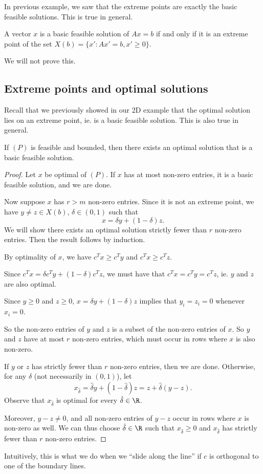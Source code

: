 \documentclass[a4paper]{article}
\begin{document}
In previous example, we saw that the extreme points are exactly the basic feasible solutions. This is true in general.
\begin{thm}
  A vector $x$ is a basic feasible solution of $Ax = b$ if and only if it is an extreme point of the set $X(b) = \{x': Ax' = b, x' \geq 0\}$.
\end{thm}
We will not prove this.

\subsection{Extreme points and optimal solutions}
Recall that we previously showed in our 2D example that the optimal solution lies on an extreme point, ie. is a basic feasible solution. This is also true in general.

\begin{thm}
  If $(P)$ is feasible and bounded, then there exists an optimal solution that is a basic feasible solution.
\end{thm}

\begin{proof}
  Let $x$ be optimal of $(P)$. If $x$ has at most non-zero entries, it is a basic feasible solution, and we are done.

  Now suppose $x$ has $r > m$ non-zero entries. Since it is not an extreme point, we have $y\not= z\in X(b)$, $\delta \in (0, 1)$ such that
  \[
    x = \delta y + (1 - \delta) z.
  \]
  We will show there exists an optimal solution strictly fewer than $r$ non-zero entries. Then the result follows by induction.

  By optimality of $x$, we have $c^T x \geq c^T y$ and $c^T x \geq c^T z$.

  Since $c^T x = \delta c^T y + (1 - \delta)c^Tz$, we must have that $c^T x = c^T y = c^T z$, ie. $y$ and $z$ are also optimal.

  Since $y \geq 0$ and $z \geq 0$, $x = \delta y + (1 - \delta) z$ implies that $y_i = z_i = 0$ whenever $x_i = 0$.

  So the non-zero entries of $y$ and $z$ is a subset of the non-zero entries of $x$. So $y$ and $z$ have at most $r$ non-zero entries, which must occur in rows where $x$ is also non-zero.

  If $y$ or $z$ has strictly fewer than $r$ non-zero entries, then we are done. Otherwise, for any $\hat{\delta}$ (not necessarily in $(0, 1)$), let
  \[
    x_{\hat{\delta}} = \hat{\delta} y + (1 - \hat{\delta}) z = z + \hat{\delta}(y - z).
  \]
  Observe that $x_{\hat{\delta}}$ is optimal for every $\hat\delta\in \R$.

  Moreover, $y - z \not= 0$, and all non-zero entries of $y - z$ occur in rows where $x$ is non-zero as well. We can thus choose $\hat\delta\in \R$ such that $x_{\hat{\delta}} \geq 0$ and $x_{\hat{\delta}}$ has strictly fewer than $r$ non-zero entries.
\end{proof}
Intuitively, this is what we do when we ``slide along the line'' if $c$ is orthogonal to one of the boundary lines.
\end{document}
